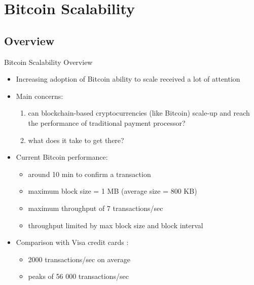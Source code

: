 \documentclass{beamer}
\begin{document}
  
  
  
  
  \section{Bitcoin Scalability}
  \subsection{Overview}
  \begin{frame}{Bitcoin Scalability Overview}
      \begin{itemize}
          \item Increasing adoption of Bitcoin \MVRightarrow ability to scale received a lot of attention 
          \item Main concerns:
          \begin{enumerate}
              \item can blockchain-based cryptocurrencies (like Bitcoin) scale-up and reach the performance of traditional payment processor? 
              \item what does it take to get there? 
          \end{enumerate}
          \pause
          \item Current Bitcoin performance: 
          \begin{itemize}
              \item around 10 min to confirm a transaction 
              \item maximum block size = 1 MB (average size = 800 KB) \cite{current-block-size}
              \item maximum throughput of 7 transactions/sec \cite{wikipedia_scalability_2018}
              \item throughput limited by max block size and block interval
          \end{itemize} \pause
          \item Comparison with Visa credit cards \cite{wikipedia_scalability_2018}:
          \begin{itemize}
              \item 2000 transactions/sec on average
              \item peaks of 56 000 transactions/sec
          \end{itemize}
      \end{itemize}
  \end{frame}
  
  
  
\end{document}
